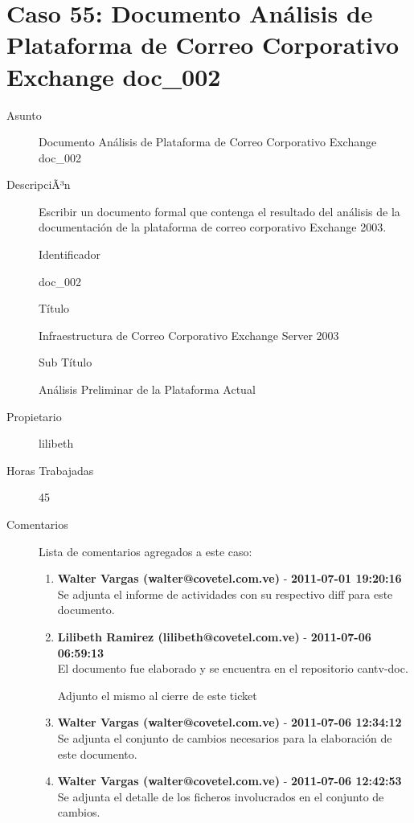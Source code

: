 \section{Caso 55: Documento Análisis de Plataforma de Correo Corporativo Exchange doc_002 }

\begin{description}

\item[Asunto] Documento Análisis de Plataforma de Correo Corporativo Exchange doc_002\item[DescripciÃ³n] Escribir un documento formal que contenga el resultado del análisis de la
documentación de la plataforma de correo corporativo Exchange 2003.

Identificador

doc_002

Título

Infraestructura de Correo Corporativo Exchange Server 2003

Sub Título

Análisis Preliminar de la Plataforma Actual\item[Propietario] lilibeth\item[Horas Trabajadas] 45

\item[Comentarios] Lista de comentarios agregados a este caso:  
\begin{enumerate}
        \item {\bfseries Walter Vargas (walter@covetel.com.ve)  } - {\bfseries 2011-07-01 19:20:16} \\ Se adjunta el informe de actividades con su respectivo diff para este
documento.        \item {\bfseries Lilibeth Ramirez (lilibeth@covetel.com.ve)  } - {\bfseries 2011-07-06 06:59:13} \\ El documento fue elaborado y se encuentra en el repositorio cantv-doc.

Adjunto el mismo al cierre de este ticket        \item {\bfseries Walter Vargas (walter@covetel.com.ve)  } - {\bfseries 2011-07-06 12:34:12} \\ Se adjunta el conjunto de cambios necesarios para la elaboración de este
documento.        \item {\bfseries Walter Vargas (walter@covetel.com.ve)  } - {\bfseries 2011-07-06 12:42:53} \\ Se adjunta el detalle de los ficheros involucrados en el conjunto de cambios.    \end{enumerate}

\end{description}

